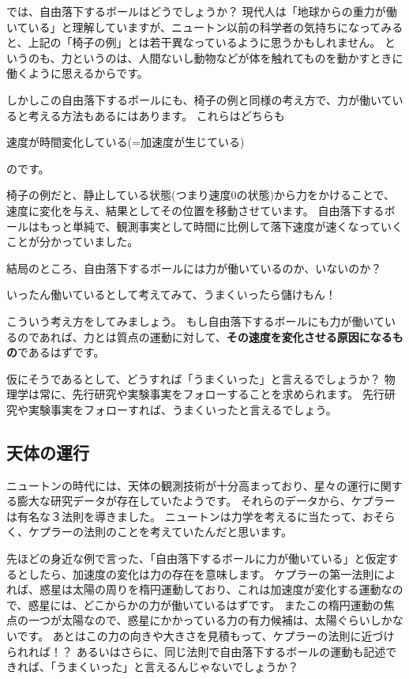 では、自由落下するボールはどうでしょうか？
現代人は「地球からの重力が働いている」と理解していますが、ニュートン以前の科学者の気持ちになってみると、上記の「椅子の例」とは若干異なっているように思うかもしれません。
というのも、力というのは、人間ないし動物などが体を触れてものを動かすときに働くように思えるからです。

しかしこの自由落下するボールにも、椅子の例と同様の考え方で、力が働いていると考える方法もあるにはあります。
これらはどちらも
\begin{center}
  速度が時間変化している(=加速度が生じている)
\end{center}
のです。

椅子の例だと、静止している状態(つまり速度0の状態)から力をかけることで、速度に変化を与え、結果としてその位置を移動させています。
自由落下するボールはもっと単純で、観測事実として時間に比例して落下速度が速くなっていくことが分かっていました。

結局のところ、自由落下するボールには力が働いているのか、いないのか？
\begin{center}
  いったん働いているとして考えてみて、うまくいったら儲けもん！
\end{center}
こういう考え方をしてみましょう。
もし自由落下するボールにも力が働いているのであれば、力とは質点の運動に対して、\textbf{その速度を変化させる原因になるもの}であるはずです。

仮にそうであるとして、どうすれば「うまくいった」と言えるでしょうか？
物理学は常に、先行研究や実験事実をフォローすることを求められます。
先行研究や実験事実をフォローすれば、うまくいったと言えるでしょう。

\subsection{天体の運行}

ニュートンの時代には、天体の観測技術が十分高まっており、星々の運行に関する膨大な研究データが存在していたようです。
それらのデータから、ケプラーは有名な３法則を導きました。
ニュートンは力学を考えるに当たって、おそらく、ケプラーの法則のことを考えていたんだと思います。

先ほどの身近な例で言った、「自由落下するボールに力が働いている」と仮定するとしたら、加速度の変化は力の存在を意味します。
ケプラーの第一法則によれば、惑星は太陽の周りを楕円運動しており、これは加速度が変化する運動なので、惑星には、どこからかの力が働いているはずです。
またこの楕円運動の焦点の一つが太陽なので、惑星にかかっている力の有力候補は、太陽ぐらいしかないです。
あとはこの力の向きや大きさを見積もって、ケプラーの法則に近づけられれば！？
あるいはさらに、同じ法則で自由落下するボールの運動も記述できれば、「うまくいった」と言えるんじゃないでしょうか？

